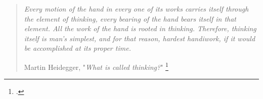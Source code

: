 \begingroup%
\makeatletter%
\cleardoublepage%
\let\newpage\relax%
\let\clearpage\relax%
\vspace*{\fill}%
\vspace*{\dimexpr-50\p@-\baselineskip}%
\begin{quotation}
\textit{Every motion of the hand in every one of its works carries itself through the element of thinking, every bearing of the hand bears itself in that element. All the work of the hand is rooted in thinking. Therefore, thinking itself is man's simplest, and for that reason, hardest handiwork, if it would be accomplished at its proper time.}
\\

\begin{flushright}
Martin Heidegger, "\textit{What is called thinking?}" \footcite{Heidegger1968}
\end{flushright}
\end{quotation}
\vspace*{\fill}%
\endgroup%



